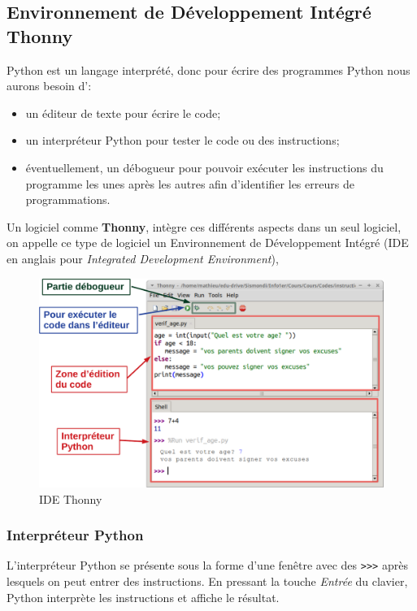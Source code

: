 \documentclass[11pt, a4paper]{book}
\begin{document}
\subsection{Environnement de Développement Intégré Thonny}
Python est un langage interprété, donc pour écrire des programmes Python nous aurons besoin d':
\begin{itemize}
	\item un éditeur de texte pour écrire le code;
	\item un interpréteur Python pour tester le code ou des instructions;
	\item éventuellement, un débogueur pour pouvoir exécuter les instructions du programme les unes après les autres afin d'identifier les erreurs de programmations.
\end{itemize}
Un logiciel comme \textbf{Thonny}, intègre ces différents aspects dans un seul logiciel, on appelle ce type de logiciel un  Environnement de  Développement Intégré (IDE en anglais pour \textit{Integrated Development Environment}),
\begin{figure}[!h]
	\centering
	\includegraphics[scale=0.5]{images/IDE_Thonny_illustre-crop.pdf}
	\caption{IDE Thonny}
\end{figure}
\subsubsection{Interpréteur Python}
L'interpréteur Python se présente sous la forme d’une fenêtre avec des \lstinline{>>>} après lesquels on peut entrer des instructions. En pressant la touche \textit{Entrée} du clavier, Python interprète les instructions et affiche le résultat.
\end{document}

